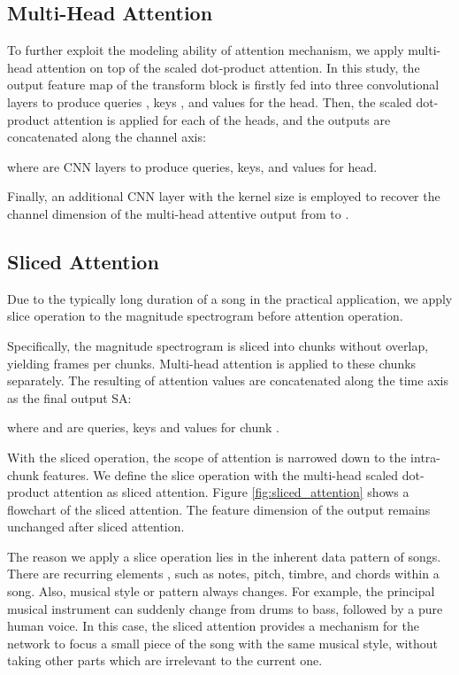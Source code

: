 \documentclass[a4paper]{article}
\begin{document}
\subsection{Multi-Head Attention}
To further exploit the modeling ability of attention mechanism, we apply multi-head attention \cite{vaswani2017attention} on top of the scaled dot-product attention. In this study, the output feature map  of the transform block is firstly fed into three convolutional layers to produce queries , keys , and values  for the  head. Then, the scaled dot-product attention is applied for each of the  heads, and the outputs are concatenated along the channel axis:

where  are CNN layers to produce queries, keys, and values for  head.

Finally, an additional CNN layer with the kernel size  is employed to recover the channel dimension of the multi-head attentive output from  to .

\subsection{Sliced Attention}
Due to the typically long duration of a song in the practical application, we apply slice operation to the magnitude spectrogram before attention operation.

Specifically, the magnitude spectrogram is sliced into  chunks without overlap, yielding  frames per chunks. Multi-head attention is applied to these  chunks separately. The resulting of  attention values are concatenated along the time axis as the final output SA:

where  and  are queries, keys and values for chunk .

With the sliced operation, the scope of attention is narrowed down to the intra-chunk features. We define the slice operation with the multi-head scaled dot-product attention as sliced attention. Figure \ref{fig:sliced_attention} shows a flowchart of the sliced attention. The feature dimension of the output remains unchanged after sliced attention.

The reason we apply a slice operation lies in the inherent data pattern of songs. There are recurring elements \cite{paulus2010state}, such as notes, pitch, timbre, and chords within a song. Also, musical style or pattern always changes. For example, the principal musical instrument can suddenly change from drums to bass, followed by a pure human voice. In this case, the sliced attention provides a mechanism for the network to focus a small piece of the song with the same musical style, without taking other parts which are irrelevant to the current one.
\end{document}
